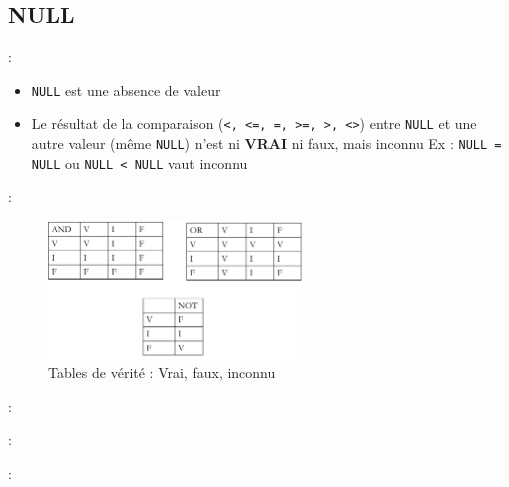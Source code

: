 \documentclass[10pt]{beamer}
\begin{document}
\subsection{NULL}
\begin{frame}{\secname : \subsecname}
    \begin{itemize}
        \item \lstinline[language=plsql]!NULL! est une absence de valeur
        \item Le résultat de la comparaison (\lstinline[language=plsql]!<, <=, =, >=, >, <>!) entre \lstinline[language=plsql]!NULL! et une autre valeur (même \lstinline[language=plsql]!NULL!) n'est ni \textbf{VRAI} ni faux, mais inconnu
              Ex : \lstinline[language=plsql]!NULL = NULL! ou \lstinline[language=plsql]!NULL < NULL! vaut inconnu
    \end{itemize}
\end{frame}
\begin{frame}{\secname : \subsecname}
    \begin{figure}
        \begin{center}
            \includegraphics[width=0.60\textwidth]{../assets/img/table_verite.pdf}
            \caption{Tables de vérité : Vrai, faux, inconnu}
        \end{center}
    \end{figure}
\end{frame}
\begin{frame}{\secname : \subsecname}
    
\end{frame}

\begin{frame}{\secname : \subsecname}
    
\end{frame}
\begin{frame}{\secname : \subsecname}
    
\end{frame}
\end{document}
